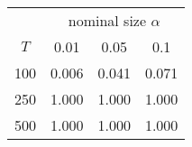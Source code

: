 % 
\begin{tabular}{cccc}
  \hline
  & \multicolumn{3}{c}{nominal size $\alpha$} \\
 $T$ & 0.01 & 0.05 & 0.1 \\
 \hline
100 & 0.006 & 0.041 & 0.071 \\ 
  250 & 1.000 & 1.000 & 1.000 \\ 
  500 & 1.000 & 1.000 & 1.000 \\ 
   \hline
\end{tabular}
